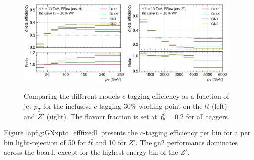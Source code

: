 \begin{figure}[h!]
    \centering
    \includegraphics[width=0.48\textwidth]{Images/FTAG/GN/GN2/pt_plots/pt_ttbar_c_eff.png}
    \includegraphics[width=0.48\textwidth]{Images/FTAG/GN/GN2/pt_plots/pt_zp_c_eff.png}
    \caption{Comparing the different models $c$-tagging efficiency as a function of jet $p_T$ for the inclusive $c$-tagging 30\% working point on the $t\bar{t}$ (left) and $Z'$ (right). The flavour fraction is set at $f^c_b = 0.2$ for all taggers.}
    \label{apfig:GNxptc_eff}
\end{figure} 

Figure \ref{apfig:GNxptc_efffixedl} presents the $c$-tagging efficiency per bin for a per bin light-rejection of 50 for $t\bar{t}$ and 10 for $Z'$. The \gls{gn2} performance dominates across the board, except for the highest energy bin of the $Z'$. 

